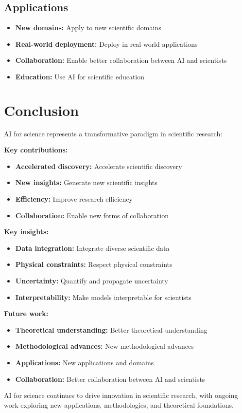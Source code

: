 \subsection{Applications}

\begin{itemize}
    \item \textbf{New domains:} Apply to new scientific domains
    \item \textbf{Real-world deployment:} Deploy in real-world applications
    \item \textbf{Collaboration:} Enable better collaboration between AI and scientists
    \item \textbf{Education:} Use AI for scientific education
\end{itemize}

\section{Conclusion}

AI for science represents a transformative paradigm in scientific research:

\textbf{Key contributions:}
\begin{itemize}
    \item \textbf{Accelerated discovery:} Accelerate scientific discovery
    \item \textbf{New insights:} Generate new scientific insights
    \item \textbf{Efficiency:} Improve research efficiency
    \item \textbf{Collaboration:} Enable new forms of collaboration
\end{itemize}

\textbf{Key insights:}
\begin{itemize}
    \item \textbf{Data integration:} Integrate diverse scientific data
    \item \textbf{Physical constraints:} Respect physical constraints
    \item \textbf{Uncertainty:} Quantify and propagate uncertainty
    \item \textbf{Interpretability:} Make models interpretable for scientists
\end{itemize}

\textbf{Future work:}
\begin{itemize}
    \item \textbf{Theoretical understanding:} Better theoretical understanding
    \item \textbf{Methodological advances:} New methodological advances
    \item \textbf{Applications:} New applications and domains
    \item \textbf{Collaboration:} Better collaboration between AI and scientists
\end{itemize}

AI for science continues to drive innovation in scientific research, with ongoing work exploring new applications, methodologies, and theoretical foundations.
